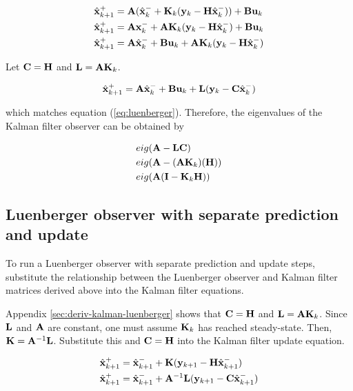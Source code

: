 \begin{align*}
  \hat{\mathbf{x}}_{k+1}^+ &= \mathbf{A}(\hat{\mathbf{x}}_k^- + \mathbf{K}_k(\mathbf{y}_k -
    \mathbf{H}\hat{\mathbf{x}}_k^-)) + \mathbf{B}\mathbf{u}_k \\
  \hat{\mathbf{x}}_{k+1}^+ &= \mathbf{A}\mathbf{x}_k^- + \mathbf{A}\mathbf{K}_k(\mathbf{y}_k -
    \mathbf{H}\hat{\mathbf{x}}_k^-) + \mathbf{B}\mathbf{u}_k \\
  \hat{\mathbf{x}}_{k+1}^+ &= \mathbf{A}\hat{\mathbf{x}}_k^- + \mathbf{B}\mathbf{u}_k +
    \mathbf{A}\mathbf{K}_k(\mathbf{y}_k - \mathbf{H}\hat{\mathbf{x}}_k^-)
\end{align*}

Let $\mathbf{C} = \mathbf{H}$ and $\mathbf{L} = \mathbf{A} \mathbf{K}_k$.

\begin{equation} \label{eq:app_kalman_leunberger}
  \hat{\mathbf{x}}_{k+1}^+ = \mathbf{A}\hat{\mathbf{x}}_k^- + \mathbf{B}\mathbf{u}_k + \mathbf{L}
    (\mathbf{y}_k - \mathbf{C}\hat{\mathbf{x}}_k^-)
\end{equation}

which matches equation (\ref{eq:luenberger}). Therefore, the eigenvalues of the
Kalman filter observer can be obtained by

\begin{align}
  &eig(\mathbf{A} - \mathbf{L}\mathbf{C}) \nonumber \\
  &eig(\mathbf{A} - (\mathbf{A}\mathbf{K}_k)(\mathbf{H})) \nonumber \\
  &eig(\mathbf{A}(\mathbf{I} - \mathbf{K}_k\mathbf{H}))
\end{align}

\subsection{Luenberger observer with separate prediction and update}
\label{subsec:deriv-luenberger-separate}

To run a Luenberger observer with separate prediction and update steps,
substitute the relationship between the Luenberger observer and Kalman filter
matrices derived above into the Kalman filter equations.

Appendix \ref{sec:deriv-kalman-luenberger} shows that $\mathbf{C} = \mathbf{H}$ and
$\mathbf{L} = \mathbf{A}\mathbf{K}_k$. Since $\mathbf{L}$ and $\mathbf{A}$ are constant, one
must assume $\mathbf{K}_k$ has reached steady-state. Then,
$\mathbf{K} = \mathbf{A}^{-1}\mathbf{L}$. Substitute this and $\mathbf{C} = \mathbf{H}$ into
the Kalman filter update equation.

\begin{align*}
  \hat{\mathbf{x}}_{k+1}^+ &= \hat{\mathbf{x}}_{k+1}^- + \mathbf{K}(\mathbf{y}_{k+1} -
    \mathbf{H}\hat{\mathbf{x}}_{k+1}^-) \\
  \hat{\mathbf{x}}_{k+1}^+ &= \hat{\mathbf{x}}_{k+1}^- + \mathbf{A}^{-1}\mathbf{L}
    (\mathbf{y}_{k+1} - \mathbf{C}\hat{\mathbf{x}}_{k+1}^-)
\end{align*}

